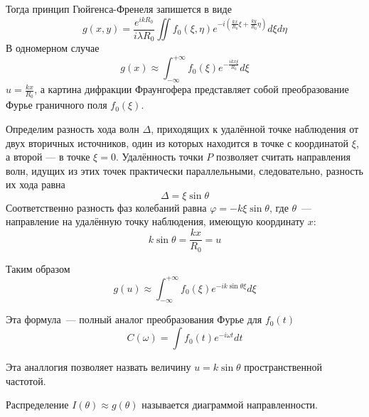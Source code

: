 Тогда принцип Гюйгенса-Френеля запишется в виде
\[
    g(x, y) = \frac{e^{ikR_{0}}}{i\lambda R_{0}}\iint f_{0}(\xi, \eta)e^{-i\left(\frac{kx}{R_{0}}\xi + \frac{ky}{R_{0}}\eta\right)} d\xi d\eta
\]
В одномерном случае
\[
    g(x) \approx \int_{-\infty}^{+\infty} f_{0}(\xi)e^{-\frac{ikx\xi}{R_{0}}}d\xi
\]
$u = \frac{kx}{R_{0}}$, а картина дифракции Фраунгофера представляет собой преобразование Фурье граничного поля $f_{0}(\xi)$.

\begin{figure}[ht!]
\end{figure}

Определим разность хода волн $\Delta$,  приходящих к удалённой точке наблюдения от двух вторичных источников, один из которых находится в точке с координатой $\xi$, а второй — в точке $\xi = 0$. Удалённость точки $P$  позволяет считать направления волн, идущих из этих точек практически параллельными, следовательно, разность их хода равна
\[
    \Delta = \xi \sin \theta
\]
Соответственно разность фаз колебаний равна $ \varphi = -k\xi \sin \theta$, где $ \theta$~--- направление на удалённую точку наблюдения, имеющую координату $x$:
\[
    k\sin \theta = \frac{kx}{R_{0}} = u
\]

Таким образом
\[
    g(u) \approx \int_{-\infty}^{+\infty} f_{0}(\xi)e^{-ik\sin \theta \xi} d\xi
\]

Эта формула~--- полный аналог преобразования Фурье для $f_{0}(t)$
\[
    C(\omega) = \int f_{0}(t)e^{-i\omega t} dt
\]

Эта аналлогия позволяет назвать величину $u=k\sin \theta$ пространственной частотой.

Распределение $I(\theta) \approx g(\theta)$ называется диаграммой направленности.

